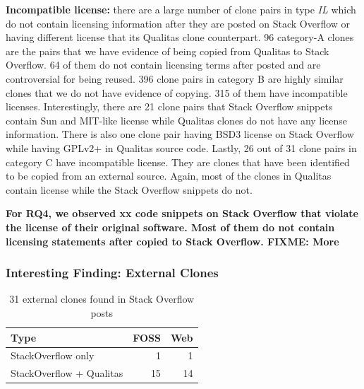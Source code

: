 \documentclass{sig-alternate-05-2015}
\newcommand\FIXME[1]{\textbf{FIXME: #1}}
\begin{document}
\textbf{Incompatible license:} there are a large number of clone pairs in type \textit{IL} which do not contain licensing information after they are posted on Stack Overflow or having different license that its Qualitas clone counterpart. 96 category-A clones are the pairs that we have evidence of being copied from Qualitas to Stack Overflow. 64 of them do not contain licensing terms after posted and are controversial for being reused. 396 clone pairs in category B are highly similar clones that we do not have evidence of copying. 315 of them have incompatible licenses. Interestingly, there are 21 clone pairs that Stack Overflow snippets contain Sun and MIT-like license while Qualitas clones do not have any license information. There is also one clone pair having BSD3 license on Stack Overflow while having GPLv2+ in Qualitas source code. Lastly, 26 out of 31 clone pairs in category C have incompatible license. They are clones that have been identified to be copied from an external source. Again, most of the clones in Qualitas contain license while the Stack Overflow snippets do not. 

\textbf{For RQ4, we observed xx code snippets on Stack Overflow that violate the license of their original software. Most of them do not contain licensing statements after copied to Stack Overflow. \FIXME{More}}

\subsubsection{Interesting Finding: External Clones}

\begin{table}[]
	\centering
	\caption{31 external clones found in Stack Overflow posts}
	\label{tab:ext_clones}
	\begin{tabular}{l|r|r}
		\hline
		Type        & FOSS & Web \\ \hline
		StackOverflow only     & 1    & 1   \\
		StackOverflow + Qualitas & 15   & 14  \\ \hline
	\end{tabular}
\end{table}
\end{document}
